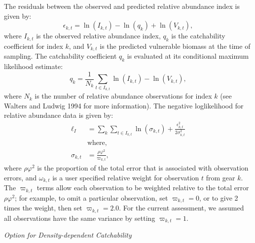 \documentclass[11pt]{article}   %
\def\newp{\vfill \break}
\begin{document}
The residuals between the observed and predicted relative abundance index is given by:
\begin{equation}\label{df30}
\epsilon_{k,t} = \ln(I_{k,t}) - \ln(q_k)+\ln(V_{k,t}),
\end{equation}
where $I_{k,t}$ is the observed relative abundance index, $q_k$ is the catchability coefficient for index $k$, and $V_{k,t}$ is the predicted vulnerable biomass at the time of sampling.  The catchability coefficient $q_k$ is evaluated at its conditional maximum likelihood estimate:
\[
  q_k =\frac{1}{N_k} \sum_{t \in I_{k,t}} \ln(I_{k,t}) - \ln(V_{k,t}),
\]
where $N_k$ is the number of relative abundance observations for index $k$ (see Walters and Ludwig 1994 for more information). The negative loglikelihood for relative abundance data is given by:
\begin{align}
\ell_I &= \sum_k \sum_{t \in I_{k,t}}  \ln(\sigma_{k,t})+\frac{\epsilon_{k,t}^2}{2\sigma_{k,t}^2} \label{df31}\\
&\mbox{where,}\nonumber\\
\sigma_{k,t} &= \frac{\rho \varphi^2}{ \varpi_{k,t}},  \nonumber
\end{align}
where $\rho \varphi^2$ is the proportion of the total error that is associated with observation errors, and $\omega_{k,t}$ is a user specified relative weight for observation $t$ from gear $k$.  The $ \varpi_{k,t}$ terms allow each observation to be weighted relative to the total error $\rho \varphi^2$; for example, to omit a particular observation, set $\varpi_{k,t}=0$, or to give 2 times the weight, then set  $\varpi_{k,t}=2.0$. For the current assessment, we assumed all observations have the same variance by setting  $\varpi_{k,t}=1$. 

\newp
\textit{Option for Density-dependent Catchability}
\end{document}
